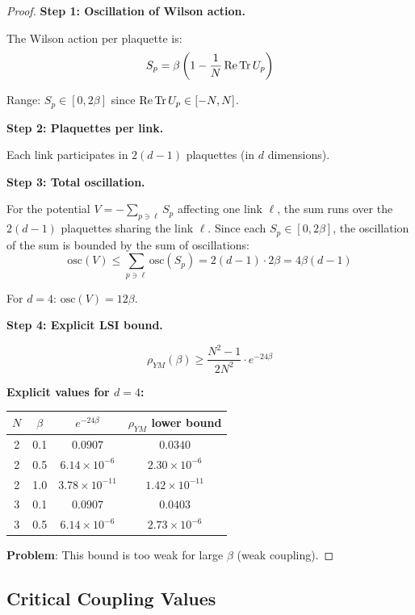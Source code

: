 \begin{proof}
\textbf{Step 1: Oscillation of Wilson action.}

The Wilson action per plaquette is:
\[
S_p = \beta \left(1 - \frac{1}{N}\operatorname{Re}\operatorname{Tr} U_p\right)
\]

Range: $S_p \in [0, 2\beta]$ since $\operatorname{Re}\operatorname{Tr} U_p \in [-N, N]$.

\textbf{Step 2: Plaquettes per link.}

Each link participates in $2(d-1)$ plaquettes (in $d$ dimensions).

\textbf{Step 3: Total oscillation.}

For the potential $V = -\sum_{p \ni \ell} S_p$ affecting one link $\ell$, the sum runs over the $2(d-1)$ plaquettes sharing the link $\ell$.
Since each $S_p \in [0, 2\beta]$, the oscillation of the sum is bounded by the sum of oscillations:
\[
\mathrm{osc}(V) \leq \sum_{p \ni \ell} \mathrm{osc}(S_p) = 2(d-1) \cdot 2\beta = 4\beta(d-1)
\]

For $d=4$: $\mathrm{osc}(V) = 12\beta$.

\textbf{Step 4: Explicit LSI bound.}

\[
\rho_{YM}(\beta) \geq \frac{N^2-1}{2N^2} \cdot e^{-24\beta}
\]

\textbf{Explicit values for $d=4$:}
\begin{center}
\begin{tabular}{|c|c|c|c|}
\hline
$N$ & $\beta$ & $e^{-24\beta}$ & $\rho_{YM}$ lower bound \\
\hline
2 & 0.1 & $0.0907$ & $0.0340$ \\
2 & 0.5 & $6.14 \times 10^{-6}$ & $2.30 \times 10^{-6}$ \\
2 & 1.0 & $3.78 \times 10^{-11}$ & $1.42 \times 10^{-11}$ \\
3 & 0.1 & $0.0907$ & $0.0403$ \\
3 & 0.5 & $6.14 \times 10^{-6}$ & $2.73 \times 10^{-6}$ \\
\hline
\end{tabular}
\end{center}

\textbf{Problem}: This bound is too weak for large $\beta$ (weak coupling).
\end{proof}

\subsection{Critical Coupling Values}

